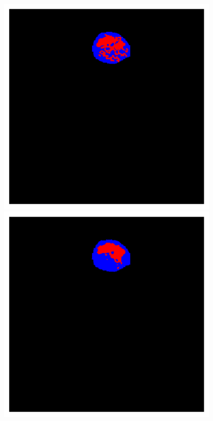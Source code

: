 {\begin{figure}[!ht]
\begin{mdframed}[backgroundcolor=blue!50,linecolor=blue!50]
\begin{minipage}{4cm}
	\end{minipage} \hspace{-0.3cm}
	\begin{minipage}{4cm}
		\includegraphics[width=\linewidth]{images/NecrosisVE_GT_Pat0_13}
	\end{minipage} \hspace{-0.3cm}
	\begin{minipage}{4cm}
		\includegraphics[width=\linewidth]{images/NecrosisVE_Pred_Pat0_13}

\end{minipage}
\end{mdframed}
\end{figure}}
